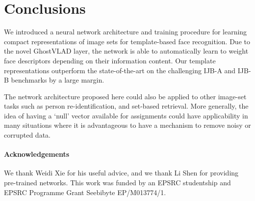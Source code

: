 \documentclass[runningheads]{llncs}
\begin{document}
%
%
\section{Conclusions}\label{sec:conclusion}
%
We introduced a neural network
architecture and training procedure
for learning compact representations of image sets
for template-based face recognition.
Due to the novel GhostVLAD layer, the network is able to
automatically learn to weight face descriptors
depending on their information content.
Our template representations outperform
the state-of-the-art on the challenging IJB-A and IJB-B benchmarks
by a large margin. 

The network architecture proposed here could also be applied to other
image-set tasks such as person re-identification, and set-based
retrieval. More generally, the idea of having a `null' vector available for
assignments could have applicability in many situations where it is advantageous to have 
a mechanism to remove noisy or corrupted data.


\paragraph{Acknowledgements}
We thank Weidi Xie for his useful advice, 
and we thank Li Shen for providing pre-trained
networks.
This work was funded by an EPSRC studentship and 
EPSRC Programme Grant Seebibyte EP/M013774/1.




%



%
%
\end{document}
